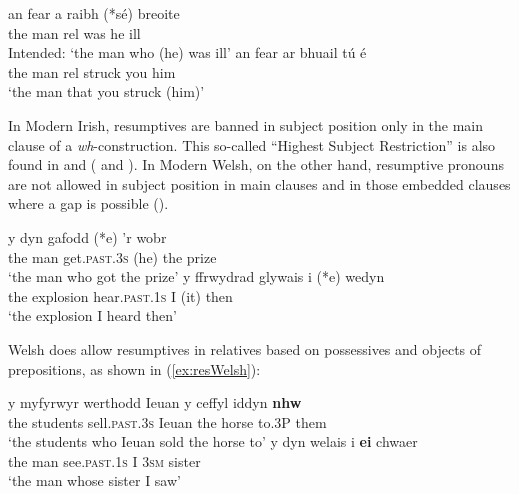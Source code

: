 \documentclass[output=paper,colorlinks,citecolor=brown]{langscibook}
\begin{document}
\ea
\ea
\settowidth{}
\gll an fear a raibh (*sé) breoite\\
the man rel was he ill\\ 
\glt Intended: `the man who (he) was ill' 
\ex 
\gll an fear ar bhuail tú é\\
the man rel struck you him\\ 
\glt `the man that you struck (him)' 
\z
\label{ex:res}
\z

\noindent In Modern Irish, resumptives are banned in subject position only in the main clause of a \textit{wh}-construction. This so-called ``Highest Subject Restriction'' is also found in  and  (\citealt{mm:shlonsky_resumptive_1992} and \citealt{mm:alexopoulou_resumption_2006}). In Modern Welsh, on the other hand, resumptive pronouns are not allowed in subject position in main clauses and in those embedded clauses where a gap is possible (\cite[108]{mm:borsleyetal2007syntax}). 

\ea 
\ea 
\settowidth{}
\gll y dyn gafodd (*e) 'r wobr\\
the man get.\textsc{past}.\textsc{3s} (he) the prize\\ 
\glt `the man who got the prize'
\ex 
\gll y ffrwydrad glywais i (*e) wedyn\\
the explosion hear.\textsc{past}.\textsc{1s} I (it) then\\ 
\glt `the explosion I heard then' 
\z
\label{ex:noresWelsh}
\z

\noindent Welsh does allow resumptives in relatives based on possessives and objects of prepositions, as shown in (\ref{ex:resWelsh}):

\ea 
\ea 
\settowidth\jamwidth{[Welsh]}
\gll y myfyrwyr werthodd Ieuan y ceffyl iddyn \textbf{nhw}\\
the students sell.\textsc{past}.\textsc{3s} Ieuan the horse to.3P them\\ \jambox{[Welsh]}
\glt `the students who Ieuan sold the horse to'
\ex 
\gll y dyn welais i \textbf{ei} chwaer\\
the man see.\textsc{past}.\textsc{1s} I \textsc{3sm} sister\\ \jambox{[Welsh]}
\glt `the man whose sister I saw' 
\z
\label{ex:resWelsh}
\z
\end{document}
